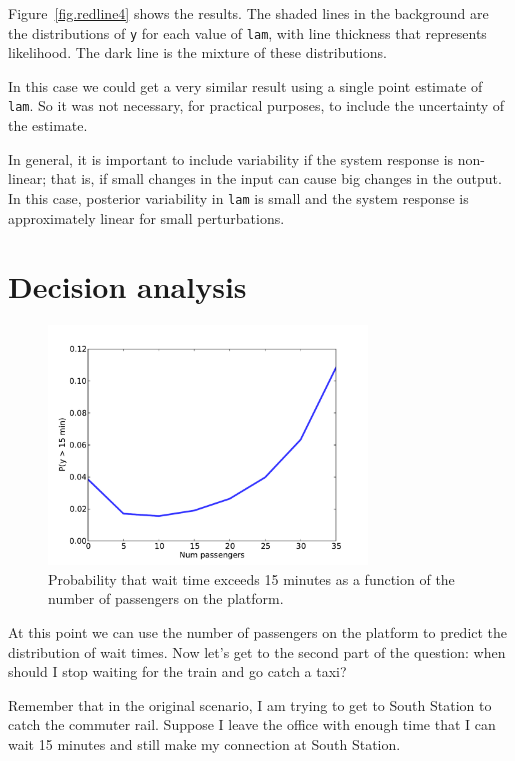 \documentclass[12pt]{book}
\begin{document}
Figure~\ref{fig.redline4} shows the results.  The shaded lines
in the background are the distributions of {\tt y} for each value
of {\tt lam}, with line thickness that represents likelihood.
The dark line is the mixture of these distributions.

In this case we could get a very similar result using a single point
estimate of {\tt lam}.  So it was not necessary, for practical purposes,
to include the uncertainty of the estimate.

In general, it is important to include variability if the system
response is non-linear; that is, if small changes in the input can
cause big changes in the output.  In this case, posterior variability
in {\tt lam} is small and the system response is approximately
linear for small perturbations.


\section{Decision analysis}

\begin{figure}
\centerline{\includegraphics[height=2.5in]{figs/redline5.pdf}}
\caption{Probability that wait time exceeds 15 minutes as
a function of the number of passengers on the platform. }
\label{fig.redline5}
\end{figure}

At this point we can use the number of passengers on the platform
to predict the distribution of wait times.  Now
let's get to the second part of the question: when should I stop
waiting for the train and go catch a taxi?

Remember that in the original scenario, I am trying to get to
South Station to catch the commuter rail.  Suppose I leave
the office with enough time that I can wait 15 minutes
and still make my connection at South Station.
\end{document}
